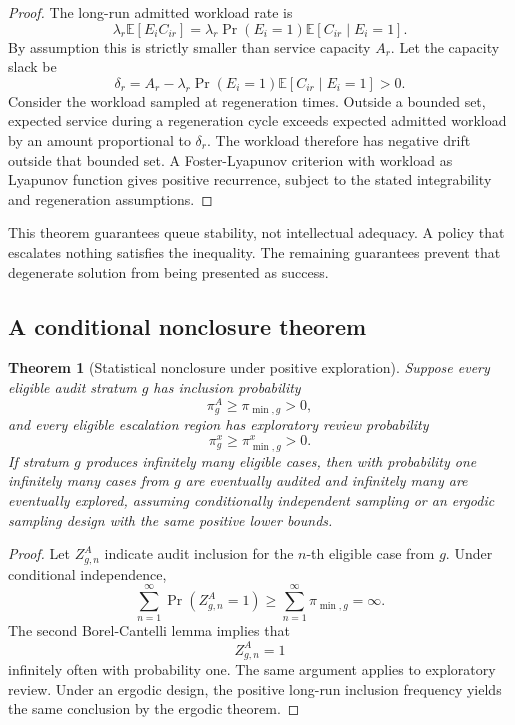 \documentclass[11pt]{article}
\newtheorem{theorem}[definition]{Theorem}
\theoremstyle{definition}
\DeclareMathOperator{\Prob}{Pr}
\newcommand{\E}{\mathbb{E}}
\begin{document}
\begin{proof}
The long-run admitted workload rate is
\[
\lambda_r
\E[E_iC_{ir}]
=
\lambda_r
\Prob(E_i=1)
\E[C_{ir}\mid E_i=1].
\]
By assumption this is strictly smaller than service capacity \(A_r\). Let the capacity slack be
\[
\delta_r
=
A_r
-
\lambda_r
\Prob(E_i=1)
\E[C_{ir}\mid E_i=1]
>0.
\]
Consider the workload sampled at regeneration times. Outside a bounded set, expected service during a regeneration cycle exceeds expected admitted workload by an amount proportional to \(\delta_r\). The workload therefore has negative drift outside that bounded set. A Foster-Lyapunov criterion with workload as Lyapunov function gives positive recurrence, subject to the stated integrability and regeneration assumptions.
\end{proof}

This theorem guarantees queue stability, not intellectual adequacy. A policy that escalates nothing satisfies the inequality. The remaining guarantees prevent that degenerate solution from being presented as success.

\subsection{A conditional nonclosure theorem}

\begin{theorem}[Statistical nonclosure under positive exploration]
Suppose every eligible audit stratum \(g\) has inclusion probability
\[
\pi_g^{A}\geq\pi_{\min,g}>0,
\]
and every eligible escalation region has exploratory review probability
\[
\pi_g^{x}\geq\pi_{\min,g}^{x}>0.
\]
If stratum \(g\) produces infinitely many eligible cases, then with probability one infinitely many cases from \(g\) are eventually audited and infinitely many are eventually explored, assuming conditionally independent sampling or an ergodic sampling design with the same positive lower bounds.
\end{theorem}

\begin{proof}
Let \(Z_{g,n}^{A}\) indicate audit inclusion for the \(n\)-th eligible case from \(g\). Under conditional independence,
\[
\sum_{n=1}^{\infty}
\Prob(Z_{g,n}^{A}=1)
\geq
\sum_{n=1}^{\infty}
\pi_{\min,g}
=
\infty.
\]
The second Borel-Cantelli lemma implies that
\[
Z_{g,n}^{A}=1
\]
infinitely often with probability one. The same argument applies to exploratory review. Under an ergodic design, the positive long-run inclusion frequency yields the same conclusion by the ergodic theorem.
\end{proof}
\end{document}
